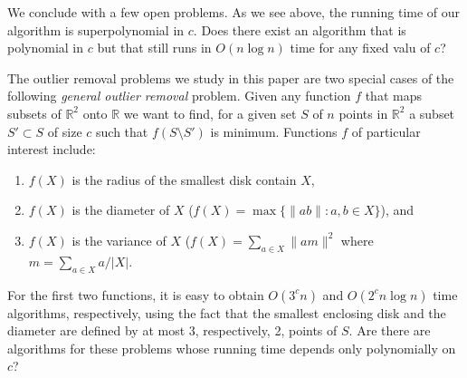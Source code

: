 \documentclass[lotsofwhite]{patmorin}
\begin{document}
We conclude with a few open problems.
As we see above, the running time of our algorithm is superpolynomial
in $c$. Does there exist an algorithm that is polynomial in $c$ but
that still runs in $O(n\log n)$ time for any fixed valu of $c$?

The outlier removal problems we study in this paper are two special
cases of the following \emph{general outlier removal} problem.  Given
any function $f$ that maps subsets of $\mathbb{R}^2$ onto $\mathbb{R}$
we want to find, for a given set $S$ of $n$ points in $\mathbb{R}^2$ a
subset $S'\subset S$ of size $c$ such that $f(S\setminus S')$ is
minimum.  Functions $f$ of particular interest include:
\begin{enumerate}
\item $f(X)$ is the radius of the smallest disk contain $X$,
\item $f(X)$ is the diameter of $X$ ($f(X)=\max\{\|ab\|:a,b\in X\}$), and
\item $f(X)$ is the variance of $X$ ($f(X)=\sum_{a\in X} \| am \|^2$
where $m=\sum_{a\in X} a/|X|$.
\end{enumerate}
For the first two functions, it is easy to obtain $O(3^c n)$ and
$O(2^cn\log n)$ time algorithms, respectively, using the fact that the
smallest enclosing disk and the diameter are defined by at most 3,
respectively, 2, points of $S$.  Are there are algorithms for these
problems whose running time depends only polynomially on $c$?
\end{document}
